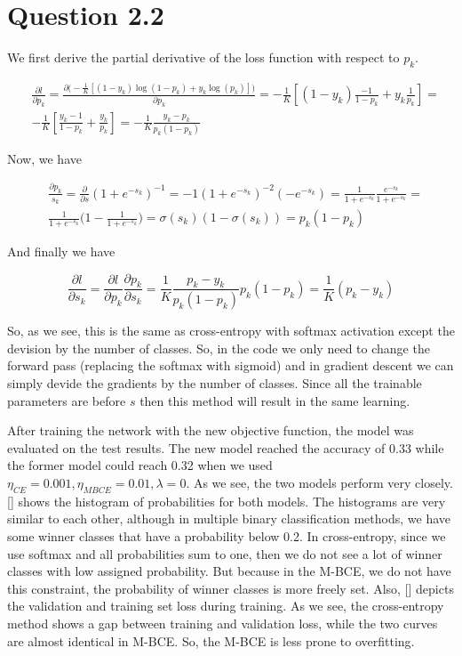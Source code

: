 \documentclass[a4paper]{article}
\begin{document}
\section*{Question 2.2}
We first derive the partial derivative of the loss function with respect to $p_k$. 

\begin{align*}
	& \frac{\partial l}{\partial p_k} = \frac{\partial \big( -\frac{1}{K}[(1-y_k) \log(1-p_k) + y_k \log(p_k)]\big)}{\partial p_k} = -\frac{1}{K} [ (1-y_k) \frac{-1}{1-p_k} + y_k \frac{1}{p_k}] = \\
	& - \frac{1}{K} [\frac{y_k - 1}{1 - p_k} + \frac{y_k}{p_k}] = -\frac{1}{K} \frac{y_k - p_k}{p_k (1-p_k)}
\end{align*}

Now, we have

\begin{align*}
	& \frac{\partial p_k}{s_k} = \frac{\partial}{\partial s} (1 + e^{-s_k})^{-1} = -1 (1 + e^{-s_k})^{-2} (-e^{-s_k}) = \frac{1}{1 + e^{-s_k}} \frac{e^{-s_k}}{1 + e^{-s_k}} = \\
	& \frac{1}{1 + e^{-s_k}}  \big( 1 -  \frac{1}{1 + e^{-s_k}} \big) = \sigma(s_k) (1-\sigma(s_k)) = p_k (1-p_k)
\end{align*}


And finally we have

$$
	\frac{\partial l}{\partial s_k} = \frac{\partial l}{\partial p_k} \frac{\partial p_k}{\partial s_k} = \frac{1}{K} \frac{p_k - y_k}{p_k (1-p_k)} p_k (1-p_k) = \frac{1}{K} (p_k - y_k)
$$

So, as we see, this is the same as cross-entropy with softmax activation except the devision by the number of classes. So, in the code we only need to change the forward pass (replacing the softmax with sigmoid) and in gradient descent we can simply devide the gradients by the number of classes. Since all the trainable parameters are before $s$ then this method will result in the same learning.


After training the network with the new objective function, the model was evaluated on the test results. The new model reached the accuracy of 0.33 while the former model could reach 0.32 when we used $\eta_{CE}=0.001, \eta_{MBCE}=0.01, \lambda=0$. As we see, the two models perform very closely. [] shows the histogram of probabilities for both models. The histograms are very similar to each other, although in multiple binary classification methods, we have some winner classes that have a probability below 0.2. In cross-entropy, since we use softmax and all probabilities sum to one, then we do not see a lot of winner classes with low assigned probability. But because in the M-BCE, we do not have this constraint, the probability of winner classes is more freely set.
Also, [] depicts the validation and training set loss during training. As we see, the cross-entropy method shows a gap between training and validation loss, while the two curves are almost identical in M-BCE. So, the M-BCE is less prone to overfitting.
\end{document}
